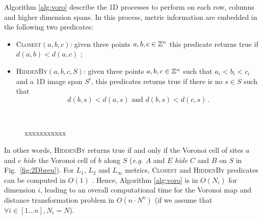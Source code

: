 \documentclass{llncs}
\begin{document}
Algorithm \ref{alg:voro} describe the 1D processes to perform on each
row, columns and higher dimension spans. In this process, metric
information are embedded in the following two predicates:
\begin{itemize}
  \item \textsc{Closest}$(a, b, c)$: given three points $a,b,c\in{\mathbb{Z}}^n$
    this predicate returns true if $d(a,b) < d(a,c)$ ;
  \item \textsc{HiddenBy}$(a, b, c, S)$: given three points
    $a,b,c\in{\mathbb{Z}}^n$ such that $a_i<b_i<c_i$ and a 1D image span $S^i$, this predicates returns
    true if there is no  $s\in S$ such that
    \begin{equation}
      d(b,s) < d(a,s)\text{ and }  d(b,s) < d(c,s)\,.
    \end{equation}
\end{itemize}

\begin{figure}
  \begin{center}
    ~~~~~~~~~~
  \end{center}
  \caption{xxxxxxxxxxx}
  \label{fig:predicates}
\end{figure}

In other words, \textsc{HiddenBy} returns true if and only if the
Voronoi cell of sites $a$ and $c$ \emph{hide} the Voronoi cell of $b$
along $S$ (\emph{e.g.} $A$ and $E$ \emph{hide} $C$ and $B$ on $S$ in
Fig.~\ref{fig:2Dbreu}).  For $L_1$, $L_2$ and $L_\infty$ metrics,
\textsc{Closest} and \textsc{HiddenBy} predicates can be computed in
$O(1)$ \cite{Breu1995,Hirata1996,Meijster2000}. Hence, Algorithm
\ref{alg:voro} is in $O(N_i)$ for dimension $i$, leading to an overall
computational time for the Voronoi map and distance transformation
problem in $O(n\cdot N^n)$ (if we assume that $\forall i\in[1\ldots
  n], N_i=N$).
\end{document}
